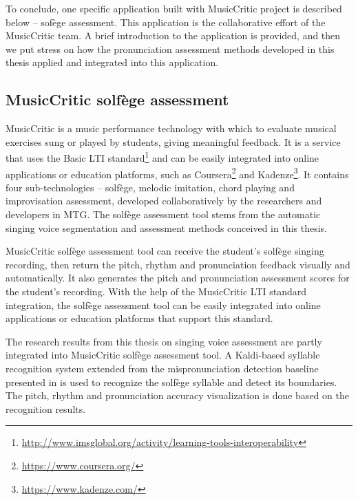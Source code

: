 To conclude, one specific application built with MusicCritic project is described below -- sofège assessment. This application is the collaborative effort of the MusicCritic team. A brief introduction to the application is provided, and then we put stress on how the pronunciation assessment methods developed in this thesis applied and integrated into this application.

\subsection{MusicCritic solfège assessment}

MusicCritic is a music performance technology with which to evaluate musical exercises sung or played by students, giving meaningful feedback. It is a service that uses the Basic LTI standard\footnote{\url{http://www.imsglobal.org/activity/learning-tools-interoperability}} and can be easily integrated into online applications or education platforms, such as Coursera\footnote{\url{https://www.coursera.org/}} and Kadenze\footnote{\url{https://www.kadenze.com/}}. It contains four sub-technologies -- solfège, melodic imitation, chord playing and improvisation assessment, developed collaboratively by the researchers and developers in MTG. The solfège assessment tool stems from the automatic singing voice segmentation and assessment methods conceived in this thesis. 

MusicCritic solfège assessment tool can receive the student's solfège singing recording, then return the pitch, rhythm and pronunciation feedback visually and automatically. It also generates the pitch and pronunciation assessment scores for the student's recording. With the help of the MusicCritic LTI standard integration, the solfège assessment tool can be easily integrated into online applications or education platforms that support this standard.

The research results from this thesis on singing voice assessment are partly integrated into MusicCritic solfège assessment tool. A Kaldi-based syllable recognition system extended from the mispronunciation detection baseline presented in  is used to recognize the solfège syllable and detect its boundaries. The pitch, rhythm and pronunciation accuracy visualization is done based on the recognition results.

